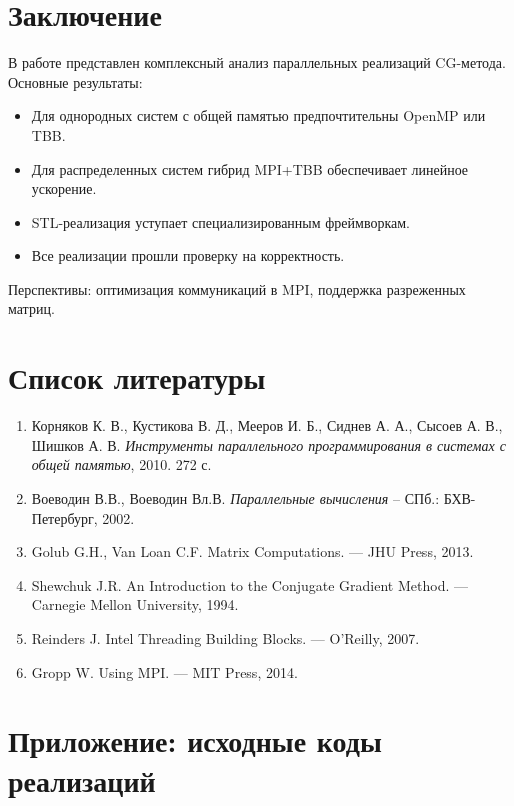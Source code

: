 \documentclass[12pt]{article}
\begin{document}
\section{Заключение}

В работе представлен комплексный анализ параллельных реализаций CG-метода. Основные результаты:
\begin{itemize}
    \item Для однородных систем с общей памятью предпочтительны OpenMP или TBB.
    \item Для распределенных систем гибрид MPI+TBB обеспечивает линейное ускорение.
    \item STL-реализация уступает специализированным фреймворкам.
    \item Все реализации прошли проверку на корректность.
\end{itemize}
Перспективы: оптимизация коммуникаций в MPI, поддержка разреженных матриц.

\section{Список литературы}
\begin{enumerate}
    \item Корняков К. В., Кустикова В. Д., Мееров И. Б., Сиднев А. А., Сысоев А. В., Шишков А. В. \textit{Инструменты параллельного программирования в системах с общей памятью}, 2010. 272 с.
    \item Воеводин В.В., Воеводин Вл.В. \textit{Параллельные вычисления} – СПб.: БХВ-Петербург, 2002.
    \item Golub G.H., Van Loan C.F. Matrix Computations. — JHU Press, 2013.
    \item Shewchuk J.R. An Introduction to the Conjugate Gradient Method. — Carnegie Mellon University, 1994.
    \item Reinders J. Intel Threading Building Blocks. — O’Reilly, 2007.
    \item Gropp W. Using MPI. — MIT Press, 2014.
\end{enumerate}

\newpage
\appendix
\section{Приложение: исходные коды реализаций}
\end{document}
